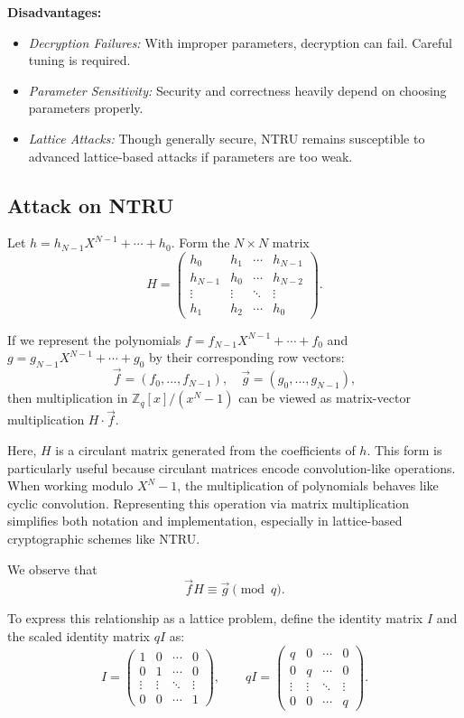 \documentclass[a4paper,12pt]{article}
\begin{document}
\textbf{Disadvantages:}
\begin{itemize}
  \item \textit{Decryption Failures:} With improper parameters, decryption can fail. Careful tuning is required.
  \item \textit{Parameter Sensitivity:} Security and correctness heavily depend on choosing parameters properly.
  \item \textit{Lattice Attacks:} Though generally secure, NTRU remains susceptible to advanced lattice-based attacks if parameters are too weak.
\end{itemize}


\subsection{Attack on NTRU}

Let \( h = h_{N-1}X^{N-1} + \cdots + h_0 \). Form the \( N \times N \) matrix
\[
H = 
\begin{pmatrix}
h_0     & h_1     & \cdots & h_{N-1} \\
h_{N-1} & h_0     & \cdots & h_{N-2} \\
\vdots  & \vdots  & \ddots & \vdots  \\
h_1     & h_2     & \cdots & h_0
\end{pmatrix}.
\]

If we represent the polynomials \( f = f_{N-1}X^{N-1} + \cdots + f_0 \) and \( g = g_{N-1}X^{N-1} + \cdots + g_0 \) by their corresponding row vectors:
\[
\vec{f} = (f_0, \dots, f_{N-1}), \quad \vec{g} = (g_0, \dots, g_{N-1}),
\]
then multiplication in \( \mathbb{Z}_q[x]/(x^N - 1) \) can be viewed as matrix-vector multiplication \( H \cdot \vec{f} \).

\vspace{0.5em}

Here, \( H \) is a circulant matrix generated from the coefficients of \( h \). This form is particularly useful because circulant matrices encode convolution-like operations. When working modulo \( X^N - 1 \), the multiplication of polynomials behaves like cyclic convolution. Representing this operation via matrix multiplication simplifies both notation and implementation, especially in lattice-based cryptographic schemes like NTRU.


We observe that
\[
\vec{f} H \equiv \vec{g} \pmod{q}.
\]

To express this relationship as a lattice problem, define the identity matrix \( I \) and the scaled identity matrix \( qI \) as:
\[
I =
\begin{pmatrix}
1 & 0 & \cdots & 0 \\
0 & 1 & \cdots & 0 \\
\vdots & \vdots & \ddots & \vdots \\
0 & 0 & \cdots & 1
\end{pmatrix}, \qquad
qI =
\begin{pmatrix}
q & 0 & \cdots & 0 \\
0 & q & \cdots & 0 \\
\vdots & \vdots & \ddots & \vdots \\
0 & 0 & \cdots & q
\end{pmatrix}.
\]
\end{document}
